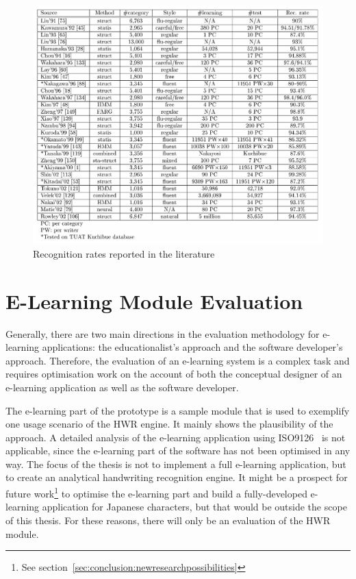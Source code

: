 \begin{figure}[htbp]
  \begin{center}
    \includegraphics[scale=0.6]{images/recognitionRatesLiuJaeger.png}
    \caption{Recognition rates reported in the literature}
    \label{fig:recognitionratesreported}
  \end{center}
\end{figure}

\section{E-Learning Module Evaluation}
\label{sec:eval:elearning}
Generally, there are two main directions in the evaluation methodology
for e-learning applications: the educationalist's approach and the 
software developer's approach.
Therefore, the evaluation of an e-learning system is a complex task
and requires optimisation work on the account of both the conceptual
designer of an e-learning application as well as the software developer.

The e-learning part of the prototype is a sample module that is used 
to exemplify one usage scenario of the HWR engine. 
It mainly shows the plausibility of the approach. A detailed analysis of the
e-learning application using ISO9126~ is not applicable,
since the e-learning part of the software has not been optimised in any way.
The focus of the thesis is not to implement a full e-learning application,
but to create an analytical handwriting recognition engine.
It might be a prospect for future 
work\footnote{See section~\ref{sec:conclusion:newresearchpossibilities}}
to optimise the e-learning part and build a fully-developed e-learning
application for Japanese characters, but that would be outside the scope of 
this thesis. For these reasons, there will only be an evaluation of the
HWR module.

